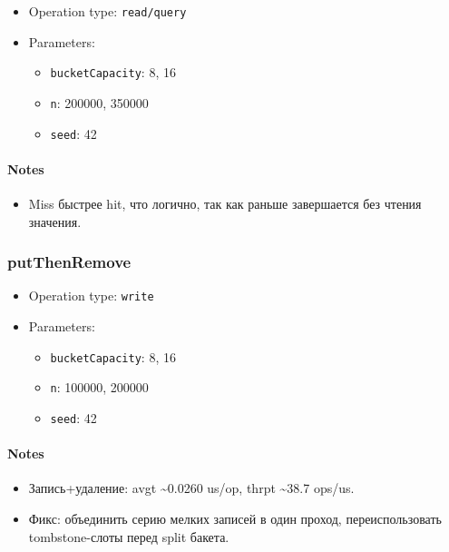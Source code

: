 \documentclass[
  10pt,
]{article}
\providecommand{\tightlist}{%
  \setlength{\itemsep}{0pt}\setlength{\parskip}{0pt}}
\begin{document}
\begin{itemize}
\tightlist
\item
  Operation type: \texttt{read/query}
\item
  Parameters:

  \begin{itemize}
  \tightlist
  \item
    \texttt{bucketCapacity}: 8, 16
  \item
    \texttt{n}: 200000, 350000
  \item
    \texttt{seed}: 42
  \end{itemize}
\end{itemize}

\paragraph{Notes}\label{notes-2}

\begin{itemize}
\tightlist
\item
  Miss быстрее hit, что логично, так как раньше завершается без чтения
  значения.
\end{itemize}

\subsubsection{putThenRemove}\label{putthenremove}

\begin{itemize}
\tightlist
\item
  Operation type: \texttt{write}
\item
  Parameters:

  \begin{itemize}
  \tightlist
  \item
    \texttt{bucketCapacity}: 8, 16
  \item
    \texttt{n}: 100000, 200000
  \item
    \texttt{seed}: 42
  \end{itemize}
\end{itemize}

\paragraph{Notes}\label{notes-3}

\begin{itemize}
\tightlist
\item
  Запись+удаление: avgt \textasciitilde0.0260 us/op, thrpt
  \textasciitilde38.7 ops/us.
\item
  Фикс: объединить серию мелких записей в один проход, переиспользовать
  tombstone-слоты перед split бакета.
\end{itemize}
\end{document}

